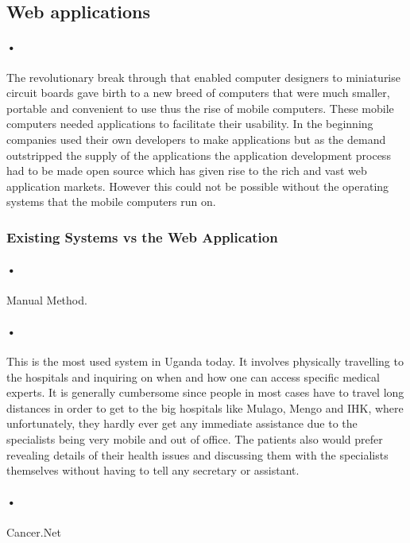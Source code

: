 \documentclass[12pt]{article}
\begin{document}
\subsection{Web applications} 
\paragraph{•}The revolutionary break through that enabled computer designers to miniaturise circuit boards gave birth to a new breed of computers that were much smaller, portable and convenient to use thus the rise of mobile computers. These mobile computers needed applications to facilitate their usability. In the beginning companies used their own developers to make applications but as the demand outstripped the supply of the applications the application development process had to be made open source which has given rise to the rich and vast web application markets. However this could not be possible without the operating systems that the mobile computers run on.

\subsubsection{Existing Systems vs the Web Application}
\paragraph{•}Manual Method.
\paragraph{•}This is the most used system in Uganda today. It involves physically travelling to the hospitals and inquiring on when and how one can access specific medical experts. It is generally cumbersome since people in most cases have to travel long distances in order to get to the big hospitals like Mulago, Mengo and IHK, where unfortunately, they hardly ever get any immediate assistance due to the specialists being very mobile and out of office. The patients also would prefer revealing details of their health issues and discussing them with the specialists themselves without having to tell any secretary or assistant.

\paragraph{•}Cancer.Net
\end{document}
